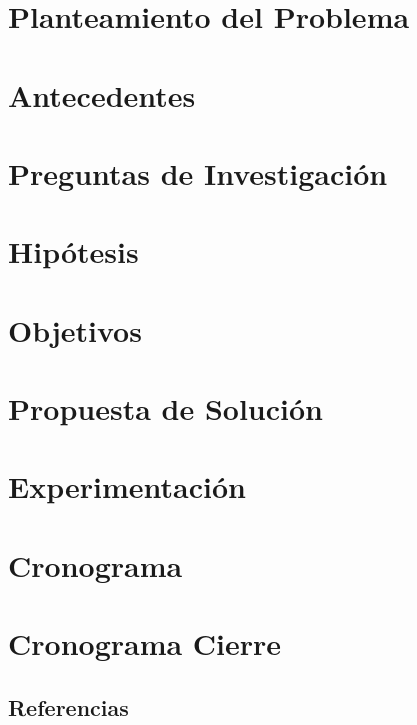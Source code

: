 \documentclass{antclass}
\begin{document}




\chapter{Planteamiento del Problema}




\chapter{Antecedentes}





%






\chapter{Preguntas de Investigación}


\chapter{Hipótesis}


\chapter{Objetivos}



\chapter{Propuesta de Solución}














\chapter{Experimentación}







\chapter{Cronograma}
\chapter{Cronograma Cierre}

\section{Referencias}


\end{document}
